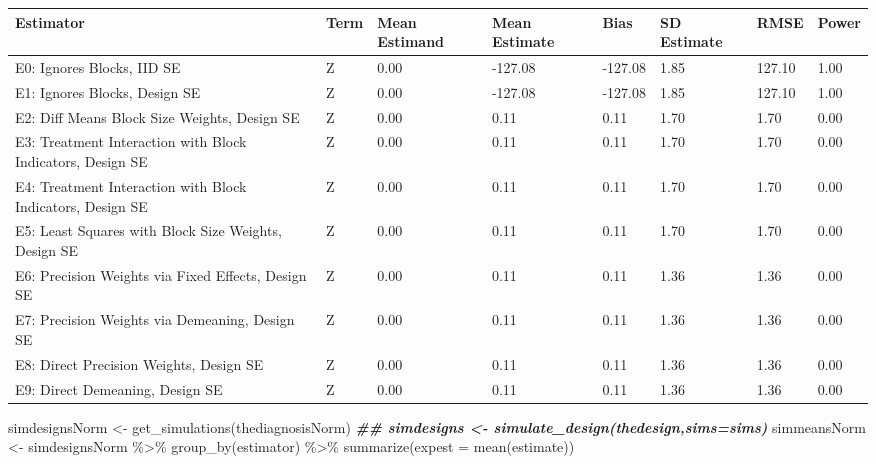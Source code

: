\documentclass[
  12pt,
]{book}
\newenvironment{Shaded}{\begin{snugshade}}{\end{snugshade}}
\newcommand{\AttributeTok}[1]{\textcolor[rgb]{0.77,0.63,0.00}{#1}}
\newcommand{\DocumentationTok}[1]{\textcolor[rgb]{0.56,0.35,0.01}{\textbf{\textit{#1}}}}
\newcommand{\FunctionTok}[1]{\textcolor[rgb]{0.00,0.00,0.00}{#1}}
\newcommand{\NormalTok}[1]{#1}
\newcommand{\OtherTok}[1]{\textcolor[rgb]{0.56,0.35,0.01}{#1}}
\newcommand{\SpecialCharTok}[1]{\textcolor[rgb]{0.00,0.00,0.00}{#1}}
\theoremstyle{definition}
\theoremstyle{definition}
\theoremstyle{definition}
\theoremstyle{remark}
\begin{document}
\begin{tabular}{l|l|l|l|l|l|l|l}
\hline
Estimator & Term & Mean Estimand & Mean Estimate & Bias & SD Estimate & RMSE & Power\\
\hline
E0: Ignores Blocks, IID SE & Z & 0.00 & -127.08 & -127.08 & 1.85 & 127.10 & 1.00\\
\hline
E1: Ignores Blocks, Design SE & Z & 0.00 & -127.08 & -127.08 & 1.85 & 127.10 & 1.00\\
\hline
E2: Diff Means Block Size Weights, Design SE & Z & 0.00 & 0.11 & 0.11 & 1.70 & 1.70 & 0.00\\
\hline
E3: Treatment Interaction with Block Indicators, Design SE & Z & 0.00 & 0.11 & 0.11 & 1.70 & 1.70 & 0.00\\
\hline
E4: Treatment Interaction with Block Indicators, Design SE & Z & 0.00 & 0.11 & 0.11 & 1.70 & 1.70 & 0.00\\
\hline
E5: Least Squares with Block Size Weights, Design SE & Z & 0.00 & 0.11 & 0.11 & 1.70 & 1.70 & 0.00\\
\hline
E6: Precision Weights via Fixed Effects, Design SE & Z & 0.00 & 0.11 & 0.11 & 1.36 & 1.36 & 0.00\\
\hline
E7: Precision Weights via Demeaning, Design SE & Z & 0.00 & 0.11 & 0.11 & 1.36 & 1.36 & 0.00\\
\hline
E8: Direct Precision Weights, Design SE & Z & 0.00 & 0.11 & 0.11 & 1.36 & 1.36 & 0.00\\
\hline
E9: Direct Demeaning, Design SE & Z & 0.00 & 0.11 & 0.11 & 1.36 & 1.36 & 0.00\\
\hline
\end{tabular}

\begin{Shaded}
\begin{Highlighting}[]
\NormalTok{simdesignsNorm }\OtherTok{\textless{}{-}} \FunctionTok{get\_simulations}\NormalTok{(thediagnosisNorm)}
\DocumentationTok{\#\# simdesigns \textless{}{-} simulate\_design(thedesign,sims=sims)}
\NormalTok{simmeansNorm }\OtherTok{\textless{}{-}}\NormalTok{ simdesignsNorm }\SpecialCharTok{\%\textgreater{}\%}
  \FunctionTok{group\_by}\NormalTok{(estimator) }\SpecialCharTok{\%\textgreater{}\%}
  \FunctionTok{summarize}\NormalTok{(}\AttributeTok{expest =} \FunctionTok{mean}\NormalTok{(estimate))}
\end{Highlighting}
\end{Shaded}
\end{document}

